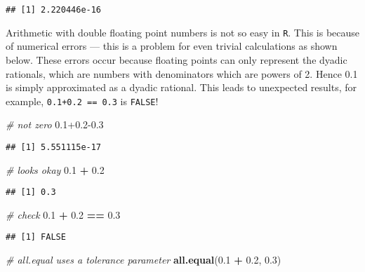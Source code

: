 \documentclass[]{article}
\newenvironment{Shaded}{\begin{snugshade}}{\end{snugshade}}
\newcommand{\CommentTok}[1]{\textcolor[rgb]{0.56,0.35,0.01}{\textit{#1}}}
\newcommand{\FloatTok}[1]{\textcolor[rgb]{0.00,0.00,0.81}{#1}}
\newcommand{\KeywordTok}[1]{\textcolor[rgb]{0.13,0.29,0.53}{\textbf{#1}}}
\newcommand{\NormalTok}[1]{#1}
\newcommand{\OperatorTok}[1]{\textcolor[rgb]{0.81,0.36,0.00}{\textbf{#1}}}
\newcommand{\StringTok}[1]{\textcolor[rgb]{0.31,0.60,0.02}{#1}}
\begin{document}
\begin{verbatim}
## [1] 2.220446e-16
\end{verbatim}

Arithmetic with double floating point numbers is not so easy in
\texttt{R}. This is because of numerical errors --- this is a problem
for even trivial calculations as shown below. These errors occur because
floating points can only represent the dyadic rationals, which are
numbers with denominators which are powers of 2. Hence 0.1 is simply
approximated as a dyadic rational. This leads to unexpected results, for
example, \texttt{0.1+0.2\ ==\ 0.3} is \texttt{FALSE}!

\begin{Shaded}
\begin{Highlighting}[]
\CommentTok{# not zero}
\FloatTok{0.1+0.2-0.3}
\end{Highlighting}
\end{Shaded}

\begin{verbatim}
## [1] 5.551115e-17
\end{verbatim}

\begin{Shaded}
\begin{Highlighting}[]
\CommentTok{# looks okay}
\FloatTok{0.1} \OperatorTok{+}\StringTok{ }\FloatTok{0.2}
\end{Highlighting}
\end{Shaded}

\begin{verbatim}
## [1] 0.3
\end{verbatim}

\begin{Shaded}
\begin{Highlighting}[]
\CommentTok{# check}
\FloatTok{0.1} \OperatorTok{+}\StringTok{ }\FloatTok{0.2} \OperatorTok{==}\StringTok{ }\FloatTok{0.3}
\end{Highlighting}
\end{Shaded}

\begin{verbatim}
## [1] FALSE
\end{verbatim}

\begin{Shaded}
\begin{Highlighting}[]
\CommentTok{# all.equal uses a tolerance parameter}
\KeywordTok{all.equal}\NormalTok{(}\FloatTok{0.1} \OperatorTok{+}\StringTok{ }\FloatTok{0.2}\NormalTok{, }\FloatTok{0.3}\NormalTok{)}
\end{Highlighting}
\end{Shaded}
\end{document}

